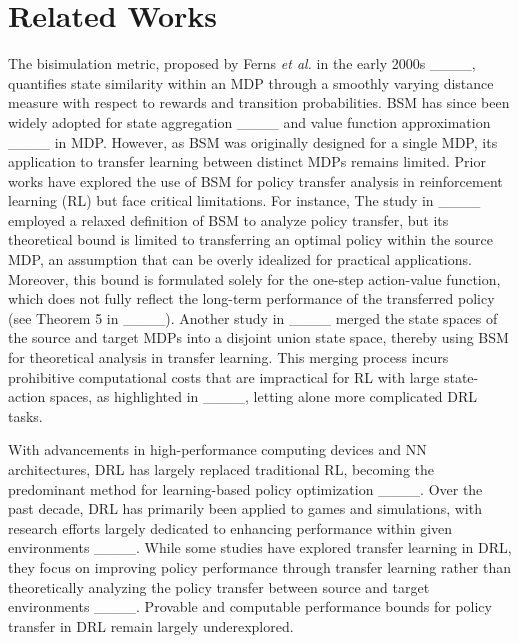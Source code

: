 \section{Related Works}
The bisimulation metric, proposed by Ferns \textit{et al.} in the early 2000s ____, quantifies state similarity within an MDP through a smoothly varying distance measure with respect to rewards and transition probabilities. BSM has since been widely adopted for state aggregation ____ and value function approximation ____ in MDP. However, as BSM was originally designed for a single MDP, its application to transfer learning between distinct MDPs remains limited. Prior works have explored the use of BSM for policy transfer analysis in reinforcement learning (RL) but face critical limitations. For instance, The study in ____ employed a relaxed definition of BSM to analyze policy transfer, but its theoretical bound is limited to transferring an optimal policy within the source MDP, an assumption that can be overly idealized for practical applications. Moreover, this bound is formulated solely for the one-step action-value function, which does not fully reflect the long-term performance of the transferred policy (see Theorem 5 in ____). Another study in ____ merged the state spaces of the source and target MDPs into a disjoint union state space, thereby using BSM for theoretical analysis in transfer learning. This merging process incurs prohibitive computational costs that are impractical for RL with large state-action spaces, as highlighted in ____, letting alone more complicated DRL tasks.
\setlength{\parskip}{0\baselineskip}

With advancements in high-performance computing devices and NN architectures, DRL has largely replaced traditional RL, becoming the predominant method for learning-based policy optimization ____. Over the past decade, DRL has primarily been applied to games and simulations, with research efforts largely dedicated to enhancing performance within given environments ____. While some studies have explored transfer learning in DRL, they focus on improving policy performance through transfer learning rather than theoretically analyzing the policy transfer between source and target environments ____. Provable and computable performance bounds for policy transfer in DRL remain largely underexplored.

